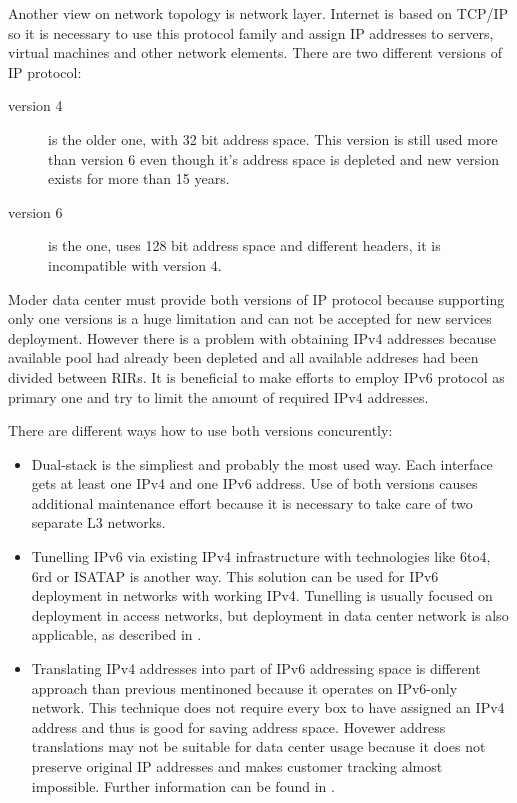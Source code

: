 Another view on network topology is network layer. Internet is based on \Ac{TCP}/\Ac{IP} so it is necessary to use this protocol family and assign \Ac{IP} addresses to servers, virtual machines and other network elements. There are two different versions of \Ac{IP} protocol:
\begin{description}
	\item[version 4] is the older one, with 32 bit address space. This version is still used more than version 6 even though it's address space is depleted and new version exists for more than 15 years.
	\item[version 6] is the  one, uses 128 bit address space and different headers, it is incompatible with version 4.
\end{description}

Moder data center must provide both versions of \Ac{IP} protocol because supporting only one versions is a huge limitation and can not be accepted for new services deployment. 
However there is a problem with obtaining \Ac{IPv4} addresses because available pool had already been depleted and all available addreses had been divided between \Ac{RIR}s. It is beneficial to make efforts to employ \Ac{IPv6} protocol as primary one and try to limit the amount of required \Ac{IPv4} addresses.


There are different ways how to use both versions concurently:
\begin{itemize}
	\item Dual-stack is the simpliest and probably the most used way. Each interface gets at least one \Ac{IPv4} and one \Ac{IPv6} address. Use of both versions causes additional maintenance effort because it is necessary to take care of two separate L3 networks.
	\item Tunelling \Ac{IPv6} via existing \Ac{IPv4} infrastructure with technologies like 6to4, 6rd or \Ac{ISATAP} is another way. This solution can be used for \Ac{IPv6} deployment in networks with working \Ac{IPv4}. 
	Tunelling is usually focused on deployment in access networks, but deployment in data center network is also applicable, as described in \cite{draft-sakura-6rd}.
	\item Translating \Ac{IPv4} addresses into part of \Ac{IPv6} addressing space is different approach than previous mentinoned because it operates on \Ac{IPv6}-only network. This technique does not require every box to have assigned an \Ac{IPv4} address and thus is good for saving address space. Hovewer address translations may not be suitable for data center usage because it does not preserve original \Ac{IP} addresses and makes customer tracking almost impossible. Further information can be found in \cite{ipv4-jako-sluzba}.
\end{itemize}

